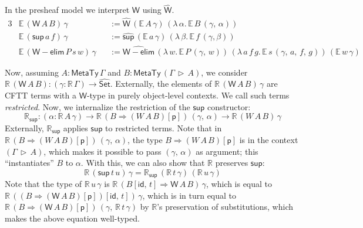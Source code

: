 \documentclass[acmsmall,screen,review,anonymous]{acmart}
\newcommand{\mit}[1]{{\mathsf{#1}}}
\newcommand{\msf}[1]{{\mathsf{#1}}}
\newcommand{\mbb}[1]{\mathbb{#1}}
\newcommand{\p}{\mathsf{p}}
\newcommand{\wh}[1]{\widehat{#1}}
\newcommand{\whset}{\wh{\Set}}
\newcommand{\ev}{\mbb{E}}
\newcommand{\re}{\mbb{R}}
\newcommand{\vW}{\mathsf{W}}
\newcommand{\vsup}{\mathsf{sup}}
\newcommand{\whW}{\wh{\vW}}
\newcommand{\Set}{\msf{Set}}
\newcommand{\ext}{\triangleright}
\newcommand{\MTy}{\msf{MetaTy}}
\theoremstyle{remark}
\newcommand{\id}{\mit{id}}
\begin{document}
In the presheaf model we interpret $\vW$ using $\whW$.
\begin{alignat*}{3}
  & \ev\,(\vW\,A\,B)\,\gamma   &&:= \wh{\vW}\,(\ev\,A\,\gamma)\,(\lambda\,\alpha.\,\ev\,B\,(\gamma,\,\alpha))\\
  & \ev\,(\vsup\,a\,f)\,\gamma &&:= \wh{\vsup}\,(\ev\,a\,\gamma)\,(\lambda\,\beta.\,\ev\,f\,(\gamma, \beta))\\
  & \ev\,(\vW{-}\msf{elim}\,P\,s\,w)\,\gamma &&:= \wh{\vW{-}\msf{elim}}\,(\lambda\,w.\,\ev\,P\,(\gamma,\,w))\,(\lambda\,a\,f\,g.\,\ev\,s\,(\gamma,\,a,\,f,\,g))\,(\ev\,w\,\gamma)
\end{alignat*}

Now, assuming $A : \MTy\,\Gamma$ and $B : \MTy\,(\Gamma\,\ext\,A)$, we consider
$\re\,(\vW\,A\,B) : (\gamma : \re\,\Gamma) \to \whset$. Externally, the elements
of $\re\,(\vW\,A\,B)\,\gamma$ are CFTT terms with a $\vW$-type in purely
object-level contexts. We call such terms \emph{restricted}. Now, we internalize
the restriction of the $\vsup$ constructor:
\[ \re_{\vsup} : (\alpha : \re\,A\,\gamma) \to \re\,(B \Rightarrow (W\,A\,B)[\p])\,(\gamma,\,\alpha) \to \re\,(W\,A\,B)\,\gamma \]
Externally, $\re_{\vsup}$ applies $\vsup$ to restricted terms. Note that in
$\re\,(B \Rightarrow (W\,A\,B)[\p])\,(\gamma,\,\alpha)$, the type $B \Rightarrow (W\,A\,B)[\p]$ is in
the context $(\Gamma\,\ext\,A)$, which makes it possible to pass $(\gamma,\,\alpha)$ as
argument; this ``instantiates'' $B$ to $\alpha$. With this, we can also
show that $\re$ preserves $\vsup$:
\[ \re\,(\vsup\,t\,u)\,\gamma = \re_\vsup\,(\re\,t\,\gamma)\,(\re\,u\,\gamma) \]
Note that the type of $\re\,u\,\gamma$ is $\re\,(B[\id,\,t] \Rightarrow
\vW\,A\,B)\,\gamma$, which is equal to $\re\,((B \Rightarrow
(\vW\,A\,B)[\p])[\id,\,t])\,\gamma$, which is in turn equal to $\re\,(B
\Rightarrow (\vW\,A\,B)[\p])\,(\gamma,\,\re\,t\,\gamma)$ by $\re$'s preservation
of substitutions, which makes the above equation well-typed.
\end{document}

